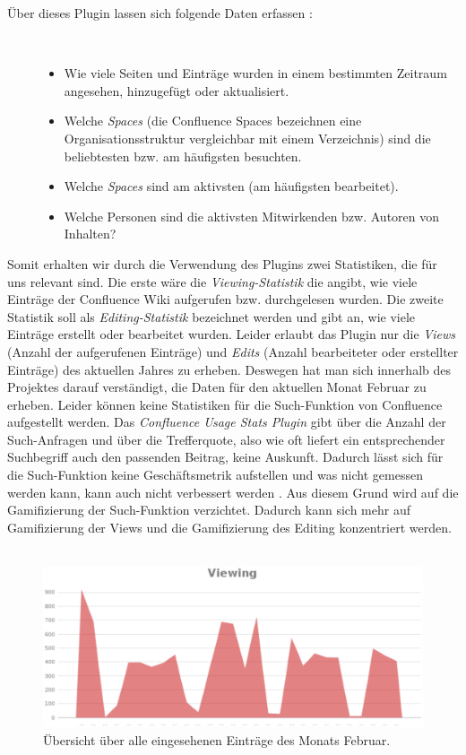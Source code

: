 \documentclass[a4paper,12pt,twoside]{scrartcl}
\begin{document}
\begin{description}
   \item[Über dieses Plugin lassen sich folgende Daten erfassen \cite{Plugin}:]~\par
   \begin{itemize}
      \item Wie viele Seiten und Einträge wurden in einem bestimmten Zeitraum angesehen, hinzugefügt oder aktualisiert. 
      \item Welche \textit{Spaces} \cite{Spaces} (die Confluence Spaces bezeichnen eine Organisationsstruktur vergleichbar mit einem Verzeichnis) sind die beliebtesten bzw. am häufigsten besuchten.
      \item Welche \textit{Spaces} sind am aktivsten (am häufigsten bearbeitet).
      \item Welche Personen sind die aktivsten Mitwirkenden bzw. Autoren von Inhalten? 
   \end{itemize}
\end{description} 
Somit erhalten wir durch die Verwendung des Plugins zwei Statistiken, die für uns relevant sind. Die erste wäre die \textit{Viewing-Statistik} die angibt, wie viele Einträge der Confluence Wiki aufgerufen bzw. durchgelesen wurden. Die zweite Statistik soll als \textit{Editing-Statistik} bezeichnet werden und gibt an, wie viele Einträge erstellt oder bearbeitet wurden. Leider erlaubt das Plugin nur die \textit{Views} (Anzahl der aufgerufenen Einträge) und \textit{Edits} (Anzahl bearbeiteter oder erstellter Einträge) des aktuellen Jahres zu erheben. Deswegen hat man sich innerhalb des Projektes darauf verständigt, die Daten für den aktuellen Monat Februar zu erheben. Leider können keine Statistiken für die Such-Funktion von Confluence aufgestellt werden. Das \textit{Confluence Usage Stats Plugin} gibt über die Anzahl der Such-Anfragen und über die Trefferquote, also wie oft liefert ein entsprechender Suchbegriff auch den passenden Beitrag, keine Auskunft. Dadurch lässt sich für die Such-Funktion keine Geschäftsmetrik aufstellen und was nicht gemessen werden kann, kann auch nicht verbessert werden \cite{gamificationDefinition}. Aus diesem Grund wird auf die Gamifizierung der Such-Funktion verzichtet. Dadurch kann sich mehr auf Gamifizierung der Views und die Gamifizierung des Editing konzentriert werden.
\\\\
\begin{figure}[h!]
\begin{center}
\includegraphics[scale = 0.6]{Bilder/StatsFebView.eps}
\caption{Übersicht über alle eingesehenen Einträge des Monats Februar.}
\label{StatsFebView}
\end{center}
\end{figure}
\end{document}
